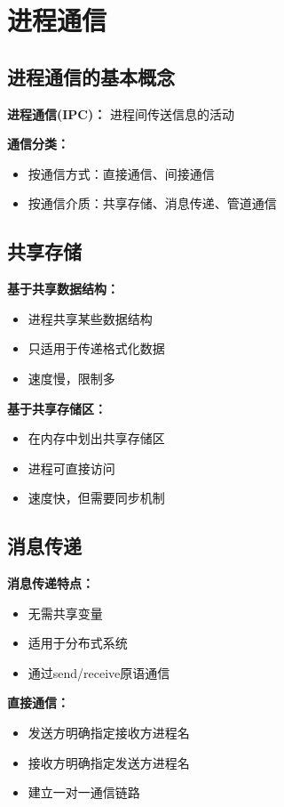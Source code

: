 \documentclass[lang=cn,newtx,10pt,scheme=chinese]{../../elegantbook}
\begin{document}
\section{进程通信}

\subsection{进程通信的基本概念}

\textbf{进程通信(IPC)：}
进程间传送信息的活动

\textbf{通信分类：}
\begin{itemize}
  \item 按通信方式：直接通信、间接通信
  \item 按通信介质：共享存储、消息传递、管道通信
\end{itemize}

\subsection{共享存储}

\textbf{基于共享数据结构：}
\begin{itemize}
  \item 进程共享某些数据结构
  \item 只适用于传递格式化数据
  \item 速度慢，限制多
\end{itemize}

\textbf{基于共享存储区：}
\begin{itemize}
  \item 在内存中划出共享存储区
  \item 进程可直接访问
  \item 速度快，但需要同步机制
\end{itemize}

\subsection{消息传递}

\textbf{消息传递特点：}
\begin{itemize}
  \item 无需共享变量
  \item 适用于分布式系统
  \item 通过send/receive原语通信
\end{itemize}

\textbf{直接通信：}
\begin{itemize}
  \item 发送方明确指定接收方进程名
  \item 接收方明确指定发送方进程名
  \item 建立一对一通信链路
\end{itemize}
\end{document}
